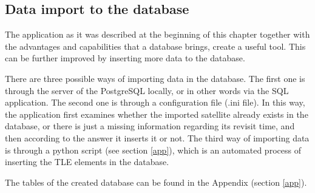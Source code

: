\bigskip
\subsection{Data import to the database}
\bigskip

The application as it was described at the beginning of this chapter together with the advantages and capabilities that a database brings, create a useful tool. This can be further improved by inserting more data to the database.

There are three possible ways of importing data in the database. The first one is through the server of the PostgreSQL locally, or in other words via the SQL application. The second one is through a configuration file (.ini file). In this way, the application first examines whether the imported satellite already exists in the database, or there is just a missing information regarding its revisit time, and then according to the answer it inserts it or not. The third way of importing data is through a python script (see section \ref{app}), which is an automated process of inserting the TLE elements in the database.


\bigskip
The tables of the created database can be found in the Appendix (section \ref{app}).